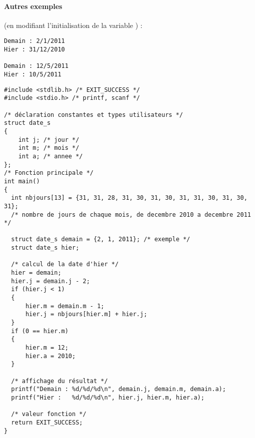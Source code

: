 \paragraph{Autres exemples} (en modifiant l'initialisation de
la variable ) :
\begin{small}
\begin{verbatim}
Demain : 2/1/2011
Hier : 31/12/2010

Demain : 12/5/2011
Hier : 10/5/2011
\end{verbatim}
\end{small}
\begin{correction}
  \begin{small}
\begin{verbatim}
#include <stdlib.h> /* EXIT_SUCCESS */
#include <stdio.h> /* printf, scanf */

/* déclaration constantes et types utilisateurs */
struct date_s 
{
    int j; /* jour */
    int m; /* mois */
    int a; /* annee */
};
/* Fonction principale */
int main()
{
  int nbjours[13] = {31, 31, 28, 31, 30, 31, 30, 31, 31, 30, 31, 30, 31};
  /* nombre de jours de chaque mois, de decembre 2010 a decembre 2011 */
    
  struct date_s demain = {2, 1, 2011}; /* exemple */
  struct date_s hier;

  /* calcul de la date d'hier */
  hier = demain;
  hier.j = demain.j - 2;
  if (hier.j < 1) 
  {
      hier.m = demain.m - 1;
      hier.j = nbjours[hier.m] + hier.j;
  }
  if (0 == hier.m) 
  {
      hier.m = 12;
      hier.a = 2010;
  }

  /* affichage du résultat */
  printf("Demain : %d/%d/%d\n", demain.j, demain.m, demain.a);
  printf("Hier :   %d/%d/%d\n", hier.j, hier.m, hier.a);

  /* valeur fonction */
  return EXIT_SUCCESS;
}
\end{verbatim}
  \end{small}
  

\end{correction}
